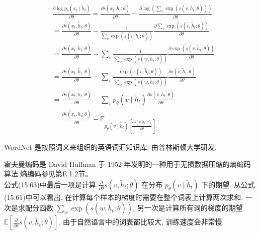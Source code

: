 \documentclass[10pt]{article}
\begin{document}
$$
\begin{aligned}
& \frac{\partial \log p_{\theta}\left(x_{t} \mid \tilde{h}_{t}\right)}{\partial \theta}=\frac{\partial s\left(x_{t}, \tilde{h}_{t} ; \theta\right)}{\partial \theta}-\frac{\partial \log \left(\sum_{v} \exp \left(s\left(v, \tilde{h}_{t} ; \theta\right)\right)\right)}{\partial \theta} \\
& =\frac{\partial s\left(x_{t}, \tilde{h}_{t} ; \theta\right)}{\partial \theta}-\frac{1}{\sum_{v} \exp \left(s\left(v, \tilde{h}_{t} ; \theta\right)\right)} \frac{\partial \sum_{v} \exp \left(s\left(v, \tilde{h}_{t} ; \theta\right)\right)}{\partial \theta} \\
& =\frac{\partial s\left(x_{t}, \tilde{h}_{t} ; \theta\right)}{\partial \theta}-\sum_{v} \frac{1}{\sum_{w} \exp \left(s\left(w, \tilde{h}_{t} ; \theta\right)\right)} \frac{\partial \exp \left(s\left(v, \tilde{h}_{t} ; \theta\right)\right)}{\partial \theta} \\
& =\frac{\partial s\left(x_{t}, \tilde{h}_{t} ; \theta\right)}{\partial \theta}-\sum_{v} \frac{\exp \left(s\left(v, \tilde{h}_{t} ; \theta\right)\right)}{\sum_{w} \exp \left(s\left(w, \tilde{h}_{t} ; \theta\right)\right)} \frac{\partial s\left(v, \tilde{h}_{t} ; \theta\right)}{\partial \theta} \\
& =\frac{\partial s\left(x_{t}, \tilde{h}_{t} ; \theta\right)}{\partial \theta}-\sum_{v} p_{\theta}\left(v \mid \tilde{h}_{t}\right) \frac{\partial s\left(v, \tilde{h}_{t} ; \theta\right)}{\partial \theta} \\
& =\frac{\partial s\left(x_{t}, \tilde{h}_{t} ; \theta\right)}{\partial \theta}-\mathbb{E}_{p_{\theta}\left(v \mid \tilde{h}_{t}\right)\left[\frac{\partial s\left(v, \tilde{h}_{t} ; \theta\right)}{\partial \theta}\right] .} .
\end{aligned}
$$

WordNet 是按照词义来组织的英语词汇知识库, 由普林斯顿大学研发.

霍夫曼编码是 David Huffman 于 1952 年发明的一种用于无损数据压缩的熵编码算法.熵编码参见第E.1.2节。\\
公式(15.63)中最后一项是计算 $\frac{\partial}{\partial \theta} s\left(v, \tilde{h}_{t} ; \theta\right)$ 在分布 $p_{\theta}\left(v \mid \tilde{h}_{t}\right)$ 下的期望. 从公式(15.61)中可以看出, 在计算每个样本的梯度时需要在整个词表上计算两次求和. 一次是求配分函数 $\sum_{w} \exp \left(s\left(w, \tilde{h}_{t} ; \theta\right)\right)$, 另一次是计算所有词的梯度的期望 $\mathbb{E}\left[\frac{\partial}{\partial \theta} s\left(v, \tilde{h}_{t} ; \theta\right)\right]$. 由于自然语言中的词表都比较大, 训练速度会非常慢.
\end{document}
